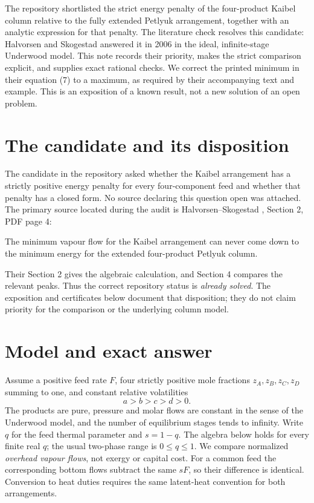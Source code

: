 \documentclass[11pt,a4paper]{report}
\begin{document}
\makepapertitle
\begin{paperabstract}
The repository shortlisted the strict energy penalty of the four-product Kaibel
column relative to the fully extended Petlyuk arrangement, together with an
analytic expression for that penalty. The literature check resolves this candidate:
Halvorsen and Skogestad answered it in 2006 in the ideal, infinite-stage Underwood
model. This note records their priority, makes the strict comparison explicit,
and supplies exact rational checks. We correct the printed minimum in their
equation (7) to a maximum, as required by their accompanying text and example.
This is an exposition of a known result, not a new solution of an open problem.
\end{paperabstract}

\section{The candidate and its disposition}
The candidate in the repository asked whether the Kaibel arrangement has a
strictly positive energy penalty for every four-component feed and whether that
penalty has a closed form. No source declaring this question open was attached.
The primary source located during the audit is Halvorsen--Skogestad
\autocite{HS2006}, Section 2, PDF page 4:
\begin{openquote}
The minimum vapour flow for the Kaibel arrangement can never come down to the
minimum energy for the extended four-product Petlyuk column.
\end{openquote}
Their Section 2 gives the algebraic calculation, and Section 4 compares the
relevant peaks. Thus the correct repository status is \emph{already solved}.
The exposition and certificates below document that disposition; they do not
claim priority for the comparison or the underlying column model.

\section{Model and exact answer}
Assume a positive feed rate \(F\), four strictly positive mole fractions
\(z_A,z_B,z_C,z_D\) summing to one, and constant relative volatilities
\[
 a>b>c>d>0.
\]
The products are pure, pressure and molar flows are constant in the sense of
the Underwood model, and the number of equilibrium stages tends to infinity.
Write \(q\) for the feed thermal parameter and \(s=1-q\). The algebra below
holds for every finite real \(q\); the usual two-phase range is \(0\le q\le1\).
We compare normalized \emph{overhead vapour flows}, not exergy or capital cost.
For a common feed the corresponding bottom flows subtract the same \(sF\),
so their difference is identical. Conversion to heat duties requires the
same latent-heat convention for both arrangements.
\end{document}
